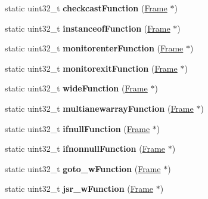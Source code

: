 \begin{DoxyCompactItemize}
\item 
static uint32\+\_\+t {\bfseries checkcast\+Function} (\hyperlink{classFrame}{Frame} $\ast$)\hypertarget{classInstruction_a40df2c2c06dcaedee53d86a8118fca2b}{}\label{classInstruction_a40df2c2c06dcaedee53d86a8118fca2b}

\item 
static uint32\+\_\+t {\bfseries instanceof\+Function} (\hyperlink{classFrame}{Frame} $\ast$)\hypertarget{classInstruction_a6534c3de6014d4ebdd434dc2f221799e}{}\label{classInstruction_a6534c3de6014d4ebdd434dc2f221799e}

\item 
static uint32\+\_\+t {\bfseries monitorenter\+Function} (\hyperlink{classFrame}{Frame} $\ast$)\hypertarget{classInstruction_a695e1dd229caacf696ae8d0849098fcd}{}\label{classInstruction_a695e1dd229caacf696ae8d0849098fcd}

\item 
static uint32\+\_\+t {\bfseries monitorexit\+Function} (\hyperlink{classFrame}{Frame} $\ast$)\hypertarget{classInstruction_a7a695d56370276da804a8dffb4a01511}{}\label{classInstruction_a7a695d56370276da804a8dffb4a01511}

\item 
static uint32\+\_\+t {\bfseries wide\+Function} (\hyperlink{classFrame}{Frame} $\ast$)\hypertarget{classInstruction_a69cc1827dc02e0eb5e77730cc0002e84}{}\label{classInstruction_a69cc1827dc02e0eb5e77730cc0002e84}

\item 
static uint32\+\_\+t {\bfseries multianewarray\+Function} (\hyperlink{classFrame}{Frame} $\ast$)\hypertarget{classInstruction_a9ea2599106e82d8b8eb9e46c39ef2a7c}{}\label{classInstruction_a9ea2599106e82d8b8eb9e46c39ef2a7c}

\item 
static uint32\+\_\+t {\bfseries ifnull\+Function} (\hyperlink{classFrame}{Frame} $\ast$)\hypertarget{classInstruction_a851fe33d238965e83d9e2a1fbd8cc418}{}\label{classInstruction_a851fe33d238965e83d9e2a1fbd8cc418}

\item 
static uint32\+\_\+t {\bfseries ifnonnull\+Function} (\hyperlink{classFrame}{Frame} $\ast$)\hypertarget{classInstruction_af048809347ebcb108cff968289f4d83b}{}\label{classInstruction_af048809347ebcb108cff968289f4d83b}

\item 
static uint32\+\_\+t {\bfseries goto\+\_\+w\+Function} (\hyperlink{classFrame}{Frame} $\ast$)\hypertarget{classInstruction_ad754d701e9bc862716016b18ab25cb93}{}\label{classInstruction_ad754d701e9bc862716016b18ab25cb93}

\item 
static uint32\+\_\+t {\bfseries jsr\+\_\+w\+Function} (\hyperlink{classFrame}{Frame} $\ast$)\hypertarget{classInstruction_ac6736898c276db171e71046f8f4adc54}{}\label{classInstruction_ac6736898c276db171e71046f8f4adc54}

\end{DoxyCompactItemize}
